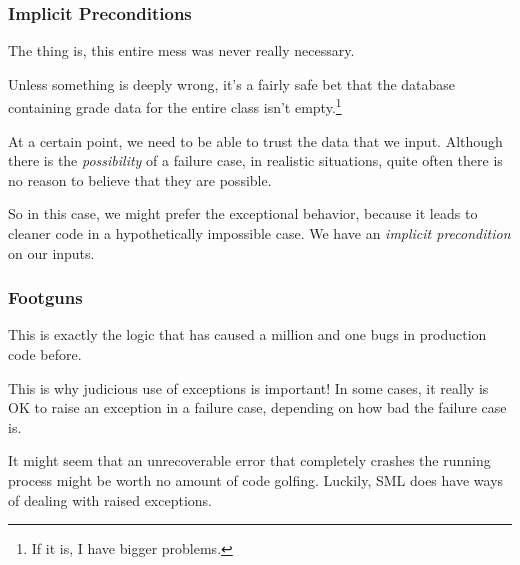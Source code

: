 \documentclass[aspectratio=169]{beamer}
\begin{document}
\begin{frame}[fragile]
  \frametitle{Implicit Preconditions}

  The thing is, this entire mess was never really necessary.

  \pause
  \vspace{\fill}

  Unless something is deeply wrong, it's a fairly safe bet that
  the database containing grade data for the entire class
  isn't empty.\footnote{
    If it is, I have bigger problems.
  }

  \pause
  \vspace{\fill}

  At a certain point, we need to be able to trust the data that we input.
  Although there is the \textit{possibility} of a failure case, in realistic
  situations, quite often there is no reason to believe that they are possible.

  \pause
  \vspace{\fill}

  So in this case, we might prefer the exceptional behavior, because it leads
  to cleaner code in a hypothetically impossible case. We have an
  \textit{implicit precondition} on our inputs.
\end{frame}

\begin{frame}[fragile]
  \frametitle{Footguns}

  This is exactly the logic that has caused a million and one bugs in production
  code before.

  \pause
  \vspace{\fill}

  This is why judicious use of exceptions is important! In some cases, it really
  is OK to raise an exception in a failure case, depending on how bad the
  failure case is.

  \pause
  \vspace{\fill}

  It might seem that an unrecoverable error that completely crashes the
  running process might be worth no amount of code golfing. Luckily,
  SML does have ways of dealing with raised exceptions.
\end{frame}

\end{document}
